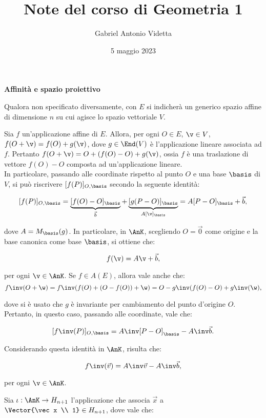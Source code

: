 \documentclass[11pt]{article}
\title{\textbf{Note del corso di Geometria 1}}
\author{Gabriel Antonio Videtta}
\date{5 maggio 2023}
\begin{document}
	
	\maketitle
	
	\begin{center}
		\Large \textbf{Affinità e spazio proiettivo}
	\end{center}
	
	\begin{note}
		Qualora non specificato diversamente, con $E$ si indicherà un
		generico spazio affine di dimensione $n$ su cui agisce lo
		spazio vettoriale $V$.
	\end{note}
	
	Sia $f$ un'applicazione affine di $E$. Allora, per ogni $O \in E$, $\v \in V$,
	$f(O + \v) = f(O) + g(\v)$, dove $g \in \End(V)$ è l'applicazione lineare
	associata ad $f$. Pertanto $f(O + \v) = O + (f(O) - O) + g(\v)$, ossia
	$f$ è una traslazione di vettore $f(O) - O$ composta ad un'applicazione
	lineare. \\
	
	In particolare, passando alle coordinate rispetto al punto $O$ e una
	base $\basis$ di $V$, si può riscrivere $[f(P)]_{O, \basis}$ secondo
	la seguente identità:
	
	\[ [f(P)]_{O, \basis} = \underbrace{[f(O) - O]_{\basis}}_{\vec b} + \underbrace{[g(P - O)]_{\basis}}_{A [\v]_\basis} = A [P - O]_\basis + \vec b, \]
	
	dove $A = M_\basis(g)$. In particolare, in $\AnK$, scegliendo $O = \vec 0$ come origine e la base canonica
	come base $\basis$, si ottiene che:
	
	\[ f(\v) = A \v + \vec b, \]
	
	per ogni $\v \in \AnK$. Se $f \in A(E)$, allora vale anche che:
	\[ f\inv(O + \w) = f\inv(f(O) + (O - f(O)) + \w) = O - g\inv(f(O) - O) + g\inv(\w), \]
	
	dove si è usato che $g$ è invariante per cambiamento del punto d'origine $O$. Pertanto,
	in questo caso, passando alle coordinate, vale che:
	
	\[ [f\inv(P)]_{O, \basis} = A\inv [P - O]_\basis - A\inv \vec b. \]
	
	Considerando questa identità in $\AnK$, risulta che:
	
	\[ f\inv(\vec v) = A\inv \vec v - A\inv \vec b, \]
	
	per ogni $\v \in \AnK$.
	
	\hr \vskip 0.1in

	Sia $\iota : \AnK \to H_{n+1}$ l'applicazione che associa $\vec x$ a $\Vector{\vec x \\ 1} \in H_{n+1}$,
	dove vale che:
	
\end{document}
